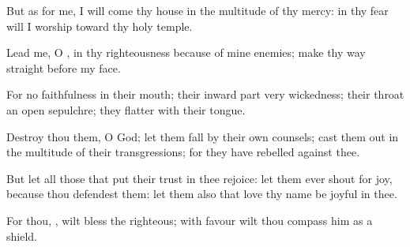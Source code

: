 {\Q {}But as for me, I will
come
{} thy
house in the
multitude of thy
mercy:
{} in thy
fear will I
worship toward thy
holy
temple.


\par }{\Q {}Lead me, O
{}, in thy
righteousness because of mine
enemies; make thy
way
straight before my
face.


\par }{\Q {}For
{} no
faithfulness in their
mouth; their
inward part
{} very
wickedness; their
throat
{} an
open
sepulchre; they
flatter with their
tongue.


\par }{\Q {}Destroy thou them, O
God; let them
fall by their own
counsels; cast them
out in the
multitude of their
transgressions; for they have
rebelled against thee.


\par }{\Q {}But let all those that put their
trust in thee
rejoice: let them
ever shout for
joy, because thou
defendest them: let them also that
love thy
name be
joyful in thee.


\par }{\Q {}For thou,
{}, wilt
bless the
righteous; with
favour wilt thou
compass him as
{} a
shield.




\par }

